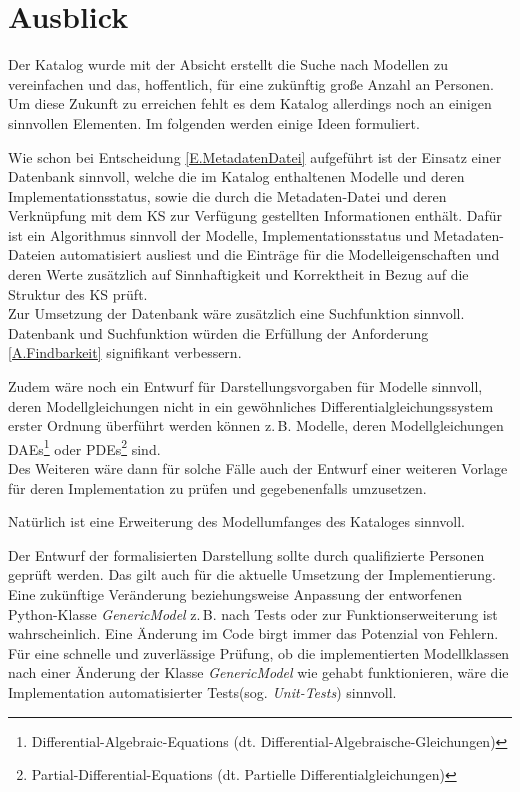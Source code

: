 \section{Ausblick} 
Der Katalog wurde mit der Absicht erstellt die Suche nach Modellen zu vereinfachen und das, hoffentlich, für eine zukünftig große Anzahl an Personen. Um diese Zukunft zu erreichen fehlt es dem Katalog allerdings noch an einigen sinnvollen Elementen. Im folgenden werden einige Ideen formuliert.

Wie schon bei Entscheidung \ref{E.MetadatenDatei} aufgeführt ist der Einsatz einer Datenbank sinnvoll, welche die im Katalog enthaltenen Modelle und deren Implementationsstatus, sowie die durch die Metadaten-Datei und deren Verknüpfung mit dem KS zur Verfügung gestellten Informationen enthält. Dafür ist ein Algorithmus sinnvoll der Modelle, Implementationsstatus und Metadaten-Dateien automatisiert ausliest und die Einträge für die Modelleigenschaften und deren Werte zusätzlich auf Sinnhaftigkeit und Korrektheit in Bezug auf die Struktur des KS prüft. \\
Zur Umsetzung der Datenbank wäre zusätzlich eine Suchfunktion sinnvoll. Datenbank und Suchfunktion würden die Erfüllung der Anforderung \ref{A.Findbarkeit} signifikant verbessern.

Zudem wäre noch ein Entwurf für Darstellungsvorgaben für Modelle sinnvoll, deren Modellgleichungen nicht in ein gewöhnliches Differentialgleichungssystem erster Ordnung überführt werden können z.\,B. Modelle, deren Modellgleichungen DAEs\footnote{Differential-Algebraic-Equations (dt. Differential-Algebraische-Gleichungen)} oder PDEs\footnote{Partial-Differential-Equations (dt. Partielle Differentialgleichungen)} sind.\\
Des Weiteren wäre dann für solche Fälle auch der Entwurf einer weiteren Vorlage für deren Implementation zu prüfen und gegebenenfalls umzusetzen.

Natürlich ist eine Erweiterung des Modellumfanges des Kataloges sinnvoll.

Der Entwurf der formalisierten Darstellung sollte durch qualifizierte Personen geprüft werden. Das gilt auch für die aktuelle Umsetzung der Implementierung. \\
Eine zukünftige Veränderung beziehungsweise Anpassung der entworfenen Python-Klasse \textit{GenericModel} z.\,B. nach Tests oder zur Funktionserweiterung ist wahrscheinlich. Eine Änderung im Code birgt immer das Potenzial von Fehlern. Für eine schnelle und zuverlässige Prüfung, ob die implementierten Modellklassen nach einer Änderung der Klasse \textit{GenericModel} wie gehabt funktionieren, wäre die Implementation automatisierter Tests(sog. \textit{Unit-Tests}) sinnvoll.

